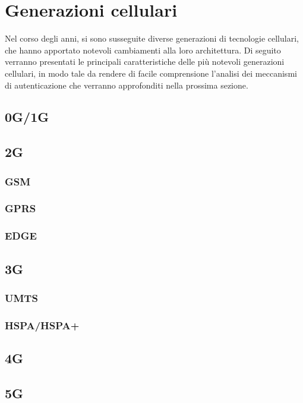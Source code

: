 \section{Generazioni cellulari}
Nel corso degli anni, si sono susseguite diverse generazioni di tecnologie cellulari, che hanno apportato
notevoli cambiamenti alla loro architettura. Di seguito verranno presentati le principali caratteristiche
delle più notevoli generazioni cellulari, in modo tale da rendere di facile comprensione l'analisi dei meccanismi
di autenticazione che verranno approfonditi nella prossima sezione.
\subsection{0G/1G}
\subsection{2G}
\subsubsection{GSM}
\subsubsection{GPRS}
\subsubsection{EDGE}
\subsection{3G}
\subsubsection{UMTS}
\subsubsection{HSPA/HSPA+}
\subsection{4G}
\subsection{5G}